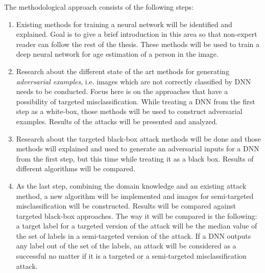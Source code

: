 The methodological approach consists of the following steps:
\begin{enumerate}
    \item Existing methods for training a neural network will be identified and explained. Goal is to give a brief introduction in this area so that non-expert reader can follow the rest of the thesis. These methods will be used to train a deep neural network for age estimation of a person in the image.
    
    \item Research about the different state of the art methods for generating \textit{adversarial examples}, i.e. images which are not correctly classified by DNN needs to be conducted. Focus here is on the approaches that have a possibility of targeted misclassification. While treating a DNN from the first step as a white-box, those methods will be used to construct adversarial examples. Results of the attacks will be presented and analyzed.
    
    \item Research about the targeted black-box attack methods will be done and those methods will explained and used to generate an adversarial inputs for a DNN  from the first step, but this time while treating it as a black box. Results of different algorithms will be compared. 
    
    \item As the last step, combining the domain knowledge and an existing attack method, a new algorithm will be implemented and images for semi-targeted misclassification will be constructed. Results will be compared against targeted black-box approaches. The way it will be compared is the following: a target label for a targeted version of the attack will be the median value of the set of labels in a semi-targeted version of the attack. If a DNN outputs any label out of the set of the labels, an attack will be considered as a successful no matter if it is a targeted or a semi-targeted misclassification attack.
\end{enumerate}